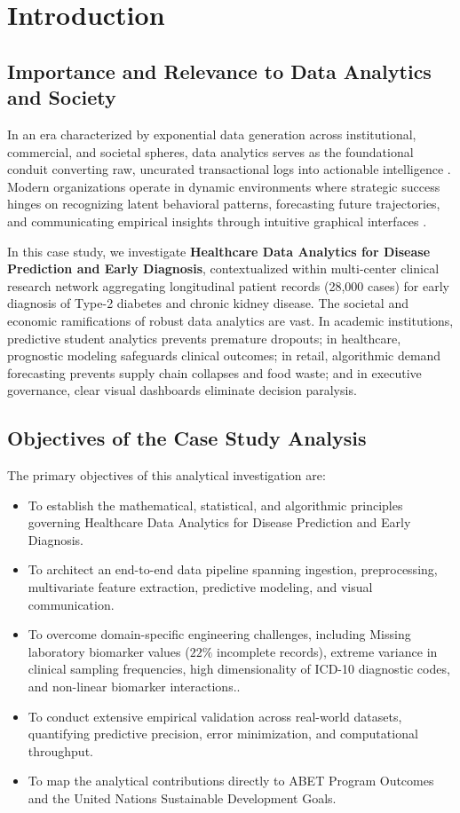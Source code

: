 \section{Introduction}

\subsection{Importance and Relevance to Data Analytics and Society}
In an era characterized by exponential data generation across institutional, commercial, and societal spheres, data analytics serves as the foundational conduit converting raw, uncurated transactional logs into actionable intelligence \cite{provost2013data}. Modern organizations operate in dynamic environments where strategic success hinges on recognizing latent behavioral patterns, forecasting future trajectories, and communicating empirical insights through intuitive graphical interfaces \cite{han2011data}.

In this case study, we investigate \textbf{Healthcare Data Analytics for Disease Prediction and Early Diagnosis}, contextualized within multi-center clinical research network aggregating longitudinal patient records (28,000 cases) for early diagnosis of Type-2 diabetes and chronic kidney disease. The societal and economic ramifications of robust data analytics are vast. In academic institutions, predictive student analytics prevents premature dropouts; in healthcare, prognostic modeling safeguards clinical outcomes; in retail, algorithmic demand forecasting prevents supply chain collapses and food waste; and in executive governance, clear visual dashboards eliminate decision paralysis.

\subsection{Objectives of the Case Study Analysis}
The primary objectives of this analytical investigation are:
\begin{itemize}
  \item To establish the mathematical, statistical, and algorithmic principles governing Healthcare Data Analytics for Disease Prediction and Early Diagnosis.
  \item To architect an end-to-end data pipeline spanning ingestion, preprocessing, multivariate feature extraction, predictive modeling, and visual communication.
  \item To overcome domain-specific engineering challenges, including Missing laboratory biomarker values ($22\%$ incomplete records), extreme variance in clinical sampling frequencies, high dimensionality of ICD-10 diagnostic codes, and non-linear biomarker interactions..
  \item To conduct extensive empirical validation across real-world datasets, quantifying predictive precision, error minimization, and computational throughput.
  \item To map the analytical contributions directly to ABET Program Outcomes and the United Nations Sustainable Development Goals.
\end{itemize}
